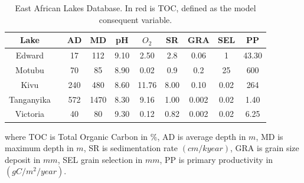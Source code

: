 \documentclass[aspectratio=169]{beamer} %
\begin{document}
{{{{{{
{
\begin{frame}
	\footnotesize
	\begin{table}
		\caption{ East African Lakes Database. In red is TOC, defined as the model consequent variable. \citep{Talbot1988,Bronikowska2021,ZSWZIA2016}} %
		\centering
		\begin{tabular}{c| c c c c c c c c c} 
			\hline\hline %
			Lake & \color{red}{TOC} & AD & MD & pH &$ O_{2}$ & SR & GRA & SEL & PP \\ [0.5ex] %
			\hline %
			Edward    & \color{red}{11.62} & 17 & 112 & 9.10 & 2.50 & 2.8  & 0.06 & 1    & 43.30 \\ 
			Motubu    & \color{red}{2.81}  & 70 & 85  & 8.90 & 0.02 & 0.9  & 0.2  & 25   & 600   \\
			Kivu      & \color{red}{7.14}  & 240& 480 & 8.60 & 11.76& 8.00 & 0.10 & 0.02 & 264   \\
			Tanganyika& \color{red}{4.81}  & 572& 1470& 8.30 & 9.16 & 1.00 & 0.002& 0.02 &1.40   \\
			Victoria  & \color{red}{11.23} & 40 & 80  & 9.30 & 0.12 & 0.82 & 0.002& 0.02 &6.25   \\[1ex] %
			\hline %
		\end{tabular}
		\label{lakesdatabase} %
	\end{table} 
      where TOC is Total Organic Carbon in $\%$, AD is average depth in $m$, MD is maximum depth in $m$,  SR is sedimentation rate $(cm/kyear)$, GRA is grain size deposit in $mm$, SEL grain selection in $mm$, PP is primary productivity in  $(gC/m^{2}/year)$.  


\end{frame}}}}}}}}
\end{document}
